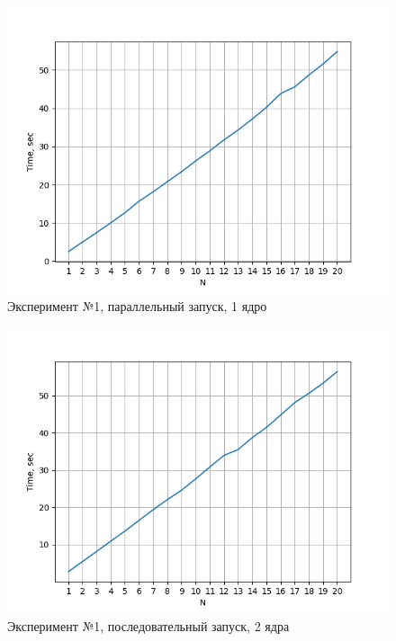 \documentclass{article}
\begin{document}
\begin{figure}
    \centering
    \includegraphics[scale=0.7]{Graphic-2.png}
    \caption{Эксперимент №1, параллельный запуск, 1 ядро}
    \label{fig:enter-label}
\end{figure}

\begin{figure}
    \centering
    \includegraphics[scale=0.7]{Graphic-3.png}
    \caption{Эксперимент №1, последовательный запуск, 2 ядра}
    \label{fig:enter-label}
\end{figure}
\end{document}
